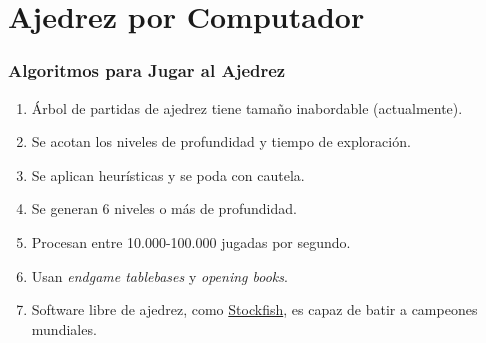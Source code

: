 \documentclass[a4paper,t,xcolor=pst,dvips,colortheme]{beamer}
\begin{document}
\begin{frame}[t]
\end{frame}

\section{Ajedrez por Computador}

\begin{frame}[c]
    \frametitle{Algoritmos para Jugar al Ajedrez}
    \begin{enumerate}[<+->]
        \item Árbol de partidas de ajedrez tiene tamaño inabordable (actualmente).
        \item Se acotan los niveles de profundidad y tiempo de exploración.
        \item Se aplican heurísticas y se poda con cautela.
        \item Se generan 6 niveles o más de profundidad.
        \item Procesan entre 10.000-100.000 jugadas por segundo.
        \item Usan \emph{endgame tablebases} y \emph{opening books}.
        \item Software libre de ajedrez, como \href{https://stockfishchess.org/}{Stockfish}, es capaz de batir a campeones mundiales.
    \end{enumerate}
\end{frame}
\end{document}
